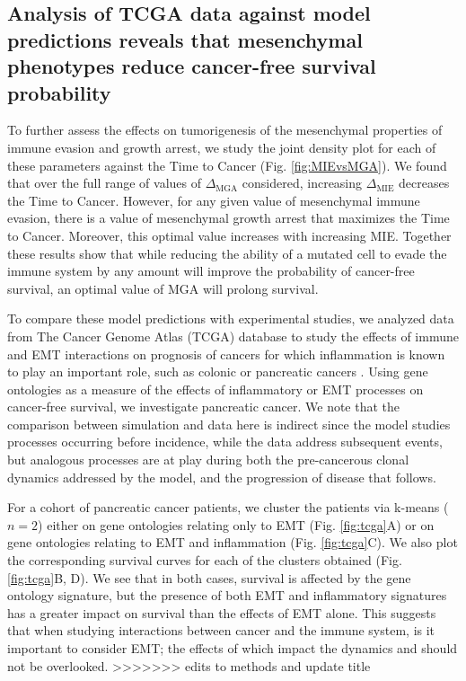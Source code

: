 \documentclass[11pt]{article}
\begin{document}
\subsection{Analysis of TCGA data against model predictions reveals that mesenchymal phenotypes reduce cancer-free survival probability}\label{tcga}
To further assess the effects on tumorigenesis of the mesenchymal properties of immune evasion and growth arrest, we study the joint density plot for each of these parameters against the Time to Cancer (Fig. \ref{fig:MIEvsMGA}). We found that over the full range of values of $\Delta_\text{MGA}$ considered, increasing $\Delta_\text{MIE}$ decreases the Time to Cancer. However, for any given value of mesenchymal immune evasion, there is a value of mesenchymal growth arrest that maximizes the Time to Cancer. Moreover, this optimal value increases with increasing MIE. Together these results show that while reducing the ability of a mutated cell to evade the immune system by any amount will improve the probability of cancer-free survival, an optimal value of MGA will prolong survival. 
\par 
To compare these model predictions with experimental studies, we analyzed data from The Cancer Genome Atlas (TCGA) database to study the effects of immune and EMT interactions on prognosis of cancers for which inflammation is known to play an important role, such as colonic or pancreatic cancers \cite{hu10_inflammationinduced, balkwill01_inflammation}. Using gene ontologies as a measure of the effects of inflammatory or EMT processes on cancer-free survival, we investigate pancreatic cancer. We note that the comparison between simulation and data here is indirect since the model studies processes occurring before incidence, while the data address subsequent events, but analogous processes are at play during both the pre-cancerous clonal dynamics addressed by the model, and the progression of disease that follows. 
\par
For a cohort of pancreatic cancer patients, we cluster the patients via k-means ($n=2$) either on gene ontologies relating only to EMT (Fig. \ref{fig:tcga}A) or on gene ontologies relating to EMT and inflammation (Fig. \ref{fig:tcga}C). We also plot the corresponding survival curves for each of the clusters obtained (Fig. \ref{fig:tcga}B, D). We see that in both cases, survival is affected by the gene ontology signature, but the presence of both EMT and inflammatory signatures has a greater impact on survival than the effects of EMT alone. This suggests that when studying interactions between cancer and the immune system, is it important to consider EMT; the effects of which impact the dynamics and should not be overlooked. 
>>>>>>> edits to methods and update title
\end{document}
